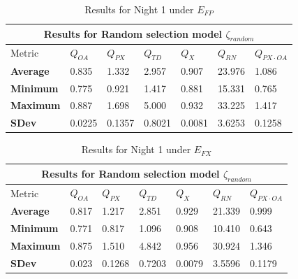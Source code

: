\clearpage
\begin{table}
\begin{center}
\begin{tabular}{lllllll}
\toprule
\multicolumn{7}{c}{Results for Random selection model $\zeta_{random}$} \\
\midrule
Metric & $Q_{OA}$ & $Q_{PX}$ & $Q_{TD}$ & $Q_{X}$ & $Q_{RN}$ & $Q_{PX \cdot OA}$ \\
\midrule
{\bf Average} & 0.835  & 1.332  & 2.957  & 0.907  & 23.976 & 1.086\\
{\bf Minimum} & 0.775  & 0.921  & 1.417  & 0.881  & 15.331 & 0.765\\
{\bf Maximum} & 0.887  & 1.698  & 5.000  & 0.932  & 33.225 & 1.417\\
{\bf SDev}    & 0.0225 & 0.1357 & 0.8021 & 0.0081 & 3.6253 & 0.1258\\
\bottomrule
\end{tabular}
\end{center}
\caption{Results for Night 1 under $E_{FP}$}
\label{tab:rand_1fp}
\end{table}

\begin{table}
\begin{center}
\begin{tabular}{lllllll}
\toprule
\multicolumn{7}{c}{Results for Random selection model $\zeta_{random}$} \\
\midrule
Metric & $Q_{OA}$ & $Q_{PX}$ & $Q_{TD}$ & $Q_{X}$ & $Q_{RN}$ & $Q_{PX \cdot OA}$ \\
\midrule
{\bf Average} & 0.817  & 1.217  & 2.851  & 0.929  & 21.339 & 0.999\\
{\bf Minimum} & 0.771  & 0.817  & 1.096  & 0.908  & 10.410 & 0.643\\
{\bf Maximum} & 0.875  & 1.510  & 4.842  & 0.956  & 30.924 & 1.346\\
{\bf SDev}    & 0.023  & 0.1268 & 0.7203 & 0.0079 & 3.5596 & 0.1179\\
\bottomrule
\end{tabular}
\end{center}
\caption{Results for Night 1 under $E_{FX}$}
\label{tab:rand_1fx}
\end{table}

